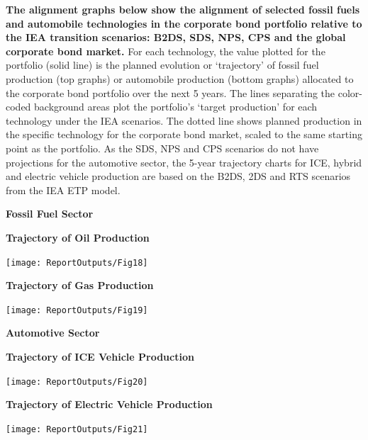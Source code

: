 \documentclass[10pt,table,a4]{article}\usepackage[]{graphicx}\usepackage[]{color}
\begin{document}
	\begin{multicols}{2}
		\textbf{The alignment graphs below show the alignment of selected fossil fuels and automobile technologies in the corporate bond portfolio relative to the IEA transition scenarios: B2DS, SDS, NPS, CPS and the global corporate bond market. } 
		For each technology, the value plotted for the portfolio (solid line) is the planned evolution or `trajectory' of fossil fuel production (top graphs) or automobile production (bottom graphs) allocated to the corporate bond portfolio over the next 5 years. The lines separating the color-coded background areas plot the portfolio's `target production' for each technology under the IEA scenarios. The dotted line shows planned production in the specific technology for the corporate bond market, scaled to the same starting point as the portfolio. As the SDS, NPS and CPS scenarios do not have projections for the automotive sector, the 5-year trajectory charts for ICE, hybrid and electric vehicle production are based on the B2DS, 2DS and RTS scenarios from the IEA ETP model.                   
		
		
	\end{multicols}		
	
	\begin{center}
		\textbf{Fossil Fuel Sector}
	\end{center}
	
	\begin{minipage}[t]{.49\linewidth}
		\textbf{Trajectory of Oil Production }
		
		\texttt{[image: ReportOutputs/Fig18]}
		
	\end{minipage}	
	\hspace{.02\linewidth}
	\begin{minipage}[t]{.49\textwidth}
		\textbf{Trajectory of Gas Production }
		
		\texttt{[image: ReportOutputs/Fig19]}
		
	\end{minipage}
	
	
	\begin{center}
		\textbf{Automotive Sector}
	\end{center}
	
	\begin{minipage}[t]{.49\linewidth}
		\textbf{Trajectory of ICE Vehicle Production}
		
		\texttt{[image: ReportOutputs/Fig20]}
		
	\end{minipage}	
	\hspace{.02\linewidth}
	\begin{minipage}[t]{.49\textwidth}
		\textbf{Trajectory of Electric Vehicle Production}
		
		\texttt{[image: ReportOutputs/Fig21]}
		
	\end{minipage}		
	
\end{document}
